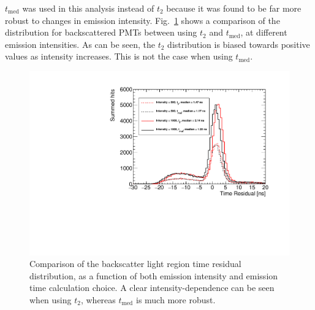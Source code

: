 $t_{\mathrm{med}}$ was used in this analysis instead of $t_{2}$ because it was found to be far more robust to changes in emission intensity. Fig.~\ref{fig:t2_temm_comparison} shows a comparison of the \tres{} distribution for backscattered PMTs between using $t_{2}$ and $t_{\mathrm{med}}$, at different emission intensities. As can be seen, the $t_{2}$ distribution is biased towards positive \tres{} values as intensity increases. This is not the case when using $t_{\mathrm{med}}$. 

\begin{figure}[!th]
    \centering
    \includegraphics[width=\textwidth]{5_SMELLIEAnalysis/images/t2_vs_tmed_backscatter_region_comparison_vs_intensity.pdf}
    \caption[Comparison of the backscatter light region time residual distribution with intensity and emission time calculation choice]
    {Comparison of the backscatter light region time residual distribution, as a function of both emission intensity and emission time calculation choice. A clear intensity-dependence can be seen when using $t_{2}$, whereas $t_{\mathrm{med}}$ is much more robust.}
    \label{fig:t2_temm_comparison}
\end{figure}




